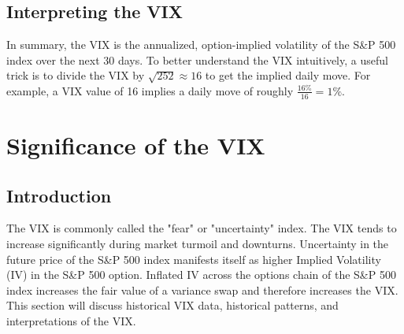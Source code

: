\documentclass[11pt, oneside]{book}
\begin{document}
\section{Interpreting the VIX} \label{CalcVix-InterpretVIX}
In summary, the VIX is the annualized, option-implied volatility of the S\&P 500 index over the next 30 days. To better understand the VIX intuitively, a useful trick is to divide the VIX by $\sqrt{252} \approx 16$ to get the implied daily move. For example, a VIX value of 16 implies a daily move of roughly $\frac{16\%}{16} = 1\%$.

\chapter{Significance of the VIX} \label{SigOfVIX}
\section{Introduction}  \label{SigOfVIX-Intro}
The VIX is commonly called the "fear" or "uncertainty" index. The VIX tends to increase significantly during market turmoil and downturns. Uncertainty in the future price of the S\&P 500 index manifests itself as higher Implied Volatility (IV) in the S\&P 500 option. Inflated IV across the options chain of the S\&P 500 index increases the fair value of a variance swap and therefore increases the VIX. This section will discuss historical VIX data, historical patterns, and interpretations of the VIX. 
\end{document}
